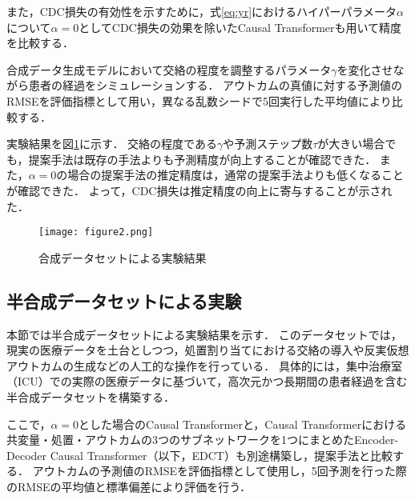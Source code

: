 \documentclass[dvipdfmx]{jreport}
\begin{document}
また，CDC損失の有効性を示すために，式\eqref{eq:yr}におけるハイパーパラメータ$\alpha$について$\alpha = 0$としてCDC損失の効果を除いたCausal Transformerも用いて精度を比較する．

合成データ生成モデルにおいて交絡の程度を調整するパラメータ$\gamma$を変化させながら患者の経過をシミュレーションする．
アウトカムの真値に対する予測値のRMSEを評価指標として用い，異なる乱数シードで5回実行した平均値により比較する．

実験結果を図\ref{fig:2}に示す．
交絡の程度である$\gamma$や予測ステップ数$\tau$が大きい場合でも，提案手法は既存の手法よりも予測精度が向上することが確認できた．
また，$\alpha = 0$の場合の提案手法の推定精度は，通常の提案手法よりも低くなることが確認できた．
よって，CDC損失は推定精度の向上に寄与することが示された．
\begin{figure}[h]
    \begin{center}
        \texttt{[image: figure2.png]} 
        \caption{合成データセットによる実験結果} \label{fig:2}
    \end{center}
\end{figure}

\subsection{半合成データセットによる実験}
本節では半合成データセットによる実験結果を示す．
このデータセットでは，現実の医療データを土台としつつ，処置割り当てにおける交絡の導入や反実仮想アウトカムの生成などの人工的な操作を行っている．
具体的には，集中治療室（ICU）での実際の医療データに基づいて，高次元かつ長期間の患者経過を含む半合成データセットを構築する．

ここで，$\alpha = 0$とした場合のCausal Transformerと，Causal Transformerにおける共変量・処置・アウトカムの3つのサブネットワークを1つにまとめたEncoder-Decoder Causal Transformer（以下，EDCT）も別途構築し，提案手法と比較する．
アウトカムの予測値のRMSEを評価指標として使用し，5回予測を行った際のRMSEの平均値と標準偏差により評価を行う．
\end{document}
